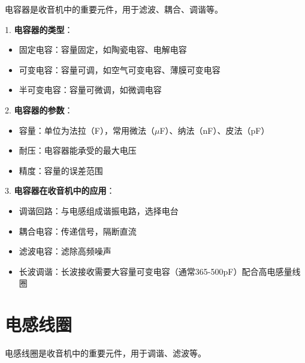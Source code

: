 \documentclass[12pt,UTF8]{ctexbook}
\begin{document}
电容器是收音机中的重要元件，用于滤波、耦合、调谐等。

1. \textbf{电容器的类型}：
   \begin{itemize}[leftmargin=3.5em]
   \item 固定电容：容量固定，如陶瓷电容、电解电容
   \item 可变电容：容量可调，如空气可变电容、薄膜可变电容
   \item 半可变电容：容量可微调，如微调电容
   \end{itemize}

2. \textbf{电容器的参数}：
   \begin{itemize}[leftmargin=3.5em]
   \item 容量：单位为法拉（F），常用微法（$\mu$F）、纳法（nF）、皮法（pF）
   \item 耐压：电容器能承受的最大电压
   \item 精度：容量的误差范围
   \end{itemize}

3. \textbf{电容器在收音机中的应用}：
   \begin{itemize}[leftmargin=3.5em]
   \item 调谐回路：与电感组成谐振电路，选择电台
   \item 耦合电容：传递信号，隔断直流
   \item 滤波电容：滤除高频噪声
   \item 长波调谐：长波接收需要大容量可变电容（通常365-500pF）配合高电感量线圈
   \end{itemize}

\section{电感线圈}

电感线圈是收音机中的重要元件，用于调谐、滤波等。
\end{document}
